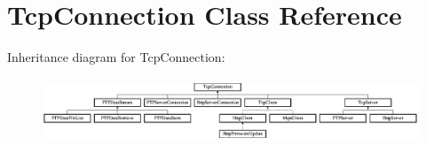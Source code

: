\hypertarget{class_tcp_connection}{}\section{Tcp\+Connection Class Reference}
\label{class_tcp_connection}
Inheritance diagram for Tcp\+Connection\+:\begin{figure}[H]
\begin{center}
\leavevmode
\includegraphics[height=1.917808cm]{class_tcp_connection}
\end{center}
\end{figure}
